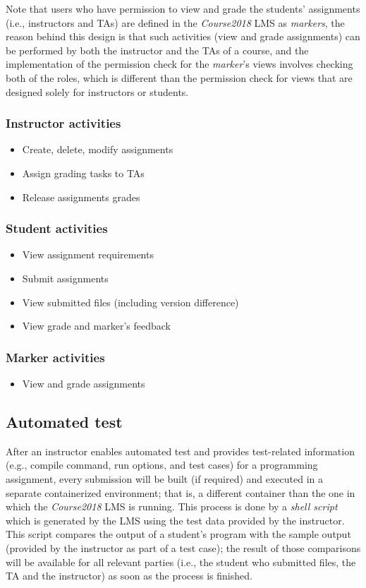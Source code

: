 \medskip 

Note that users who have permission to view and grade the students' assignments
(i.e., instructors and TAs)
are defined in the \emph{Course2018} LMS as \emph{markers}, the reason behind
this design is that such activities (view and grade assignments) can be
performed by both the instructor and the TAs of a course, and the implementation
of the permission check for the \emph{marker}'s views involves checking both
of the roles, which is different than the permission check for views that are
designed solely for instructors or students.

\medskip

\subsubsection{Instructor activities}
\begin{itemize}
    \item Create, delete, modify assignments
    \item Assign grading tasks to TAs
    \item Release assignments grades
\end{itemize}

\subsubsection{Student activities}
\begin{itemize}
    \item View assignment requirements
    \item Submit assignments
    \item View submitted files (including version difference)
    \item View grade and marker's feedback
\end{itemize}

\subsubsection{Marker activities}
\begin{itemize}
    \item View and grade assignments
\end{itemize}

\subsection{Automated test}
After an instructor enables automated test and provides test-related
information (e.g., compile command, run options, and test cases) for a
programming assignment,
every submission will be built (if required) and executed in a separate
containerized environment; that is, a different
container than the one in which the \emph{Course2018} LMS is running.
This process is done by a \emph{shell script} which is generated by the LMS
using the test data provided by the instructor. This script compares the
output of a student's program with the sample output (provided by the instructor
as part of a test case); the result of those comparisons will be available for
all relevant parties (i.e., the student who submitted files, the TA and
the instructor) as soon as the process is finished.

